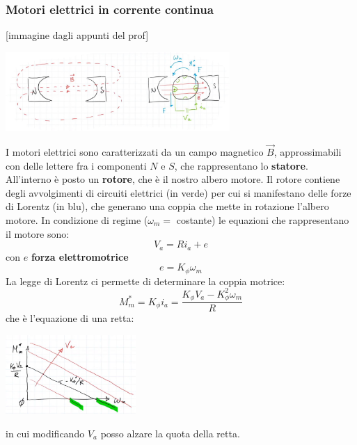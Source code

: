 \subsubsection{Motori elettrici in corrente continua}
[immagine dagli appunti del prof]
\begin{center}
    \includegraphics[height=3cm]{../lezione12/img4.JPG}
\end{center}
I motori elettrici sono caratterizzati da un campo magnetico $\vec{B}$, approssimabili con delle lettere fra i componenti $N$ e $S$, che rappresentano lo \textbf{statore}.\newline
\newline
All'interno è posto un \textbf{rotore}, che è il nostro albero motore. Il rotore contiene degli avvolgimenti di circuiti elettrici (in verde) per cui si manifestano delle forze di Lorentz (in blu), che generano una coppia che mette in rotazione l'albero motore.\newline
\newline
In condizione di regime ($\omega_m =$ costante) le equazioni che rappresentano il motore sono:
\[
    V_a = R i_a + e
\]
con $e$ \textbf{forza elettromotrice}
\[
    e = K_{\phi} \omega_m
\]
La legge di Lorentz ci permette di determinare la coppia motrice:
\[
    M_m^* = K_{\phi} i_a = \frac{K_{\phi} V_a - K_{\phi}^2 \omega_m}{R}
\]
che è l'equazione di una retta:
\begin{center}
    \includegraphics[height=3cm]{../lezione12/img5.JPG}
\end{center}
in cui modificando $V_a$ posso alzare la quota della retta.
